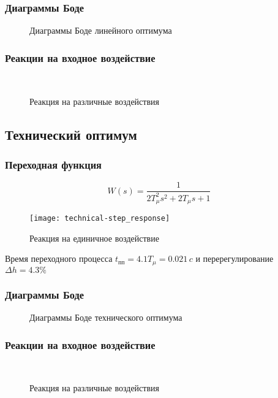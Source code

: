 			\subsubsection{Диаграммы Боде}
				\begin{figure}[H]
					\centering
					\caption{Диаграммы Боде линейного оптимума}
				\end{figure}
			\subsubsection{Реакции на входное воздействие}
				\begin{figure}[H]
					\centering
					\\
					\centering{}
					\caption{Реакция на различные воздействия}
				\end{figure}
		\subsection{Технический оптимум}
			\subsubsection{Переходная функция}
				$$W(s)=\frac{1}{2T_\mu^2 s^2+2T_\mu s+1}$$
				\begin{figure}[H]
					\centering
					\texttt{[image: technical-step\_response]}
					\caption{Реакция на единичное воздействие}
				\end{figure}
				Время переходного процесса $t_{\text{пп}}=4.1T_{\mu}=0.021\,c$ и перерегулирование $\Delta h=4.3\%$
			\subsubsection{Диаграммы Боде}
				\begin{figure}[H]
					\centering
					\caption{Диаграммы Боде технического оптимума}
				\end{figure}
			\subsubsection{Реакции на входное воздействие}
				\begin{figure}[H]
					\centering
					\\
					\centering{}
					\caption{Реакция на различные воздействия}
				\end{figure}
